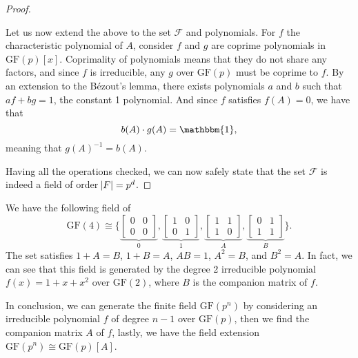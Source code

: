 \begin{proof}
\begin{itemize}
        Let us now extend the above to the set $\mathcal{F}$ and polynomials. For $f$ the characteristic polynomial of $A$, consider $f$ and $g$ are coprime polynomials in $\mathrm{GF}(p)[x]$. Coprimality of polynomials means that they do not share any factors, and since $f$ is irreducible, any $g$ over $\mathrm{GF}(p)$ must be coprime to $f$. By an extension to the B\'ezout's lemma, there exists polynomials $a$ and $b$ such that $af+bg=1$, the constant 1 polynomial. And since $f$ satisfies $f(A)=0$, we have that
        \begin{equation*}
            b(A) \cdot g(A) = \mathbbm{1},
        \end{equation*}
        meaning that $g(A)^{-1} = b(A)$.
    \end{itemize}
    Having all the operations checked, we can now safely state that the set $\mathcal{F}$ is indeed a field of order $\abs{F} = p^d$.
\end{proof}
\begin{example}
    We have the following field of
    \begin{equation*}
        \mathrm{GF}(4) \cong \Bigg\{ \underbrace{\left[\begin{matrix}
            0 & 0 \\ 0 & 0
        \end{matrix}\right]}_{0}, \underbrace{\left[\begin{matrix}
            1 & 0 \\ 0 & 1
        \end{matrix}\right]}_{1}, \underbrace{\left[\begin{matrix}
            1 & 1 \\ 1 & 0
        \end{matrix}\right]}_{A}, \underbrace{\left[\begin{matrix}
            0 & 1 \\ 1 & 1
        \end{matrix}\right]}_{B} \Bigg\}.
    \end{equation*}
    The set satisfies $1+A=B$, $1+B=A$, $AB=1$, $A^2=B$, and $B^2=A$. In fact, we can see that this field is generated by the degree 2 irreducible polynomial $f(x)=1+x+x^2$ over $\mathrm{GF}(2)$, where $B$ is the companion matrix of $f$.
\end{example}

In conclusion, we can generate the finite field $\mathrm{GF}(p^n)$ by considering an irreducible polynomial $f$ of degree $n-1$ over $\mathrm{GF}(p)$, then we find the companion matrix $A$ of $f$, lastly, we have the field extension $\mathrm{GF}(p^n) \cong \mathrm{GF}(p)[A]$.

